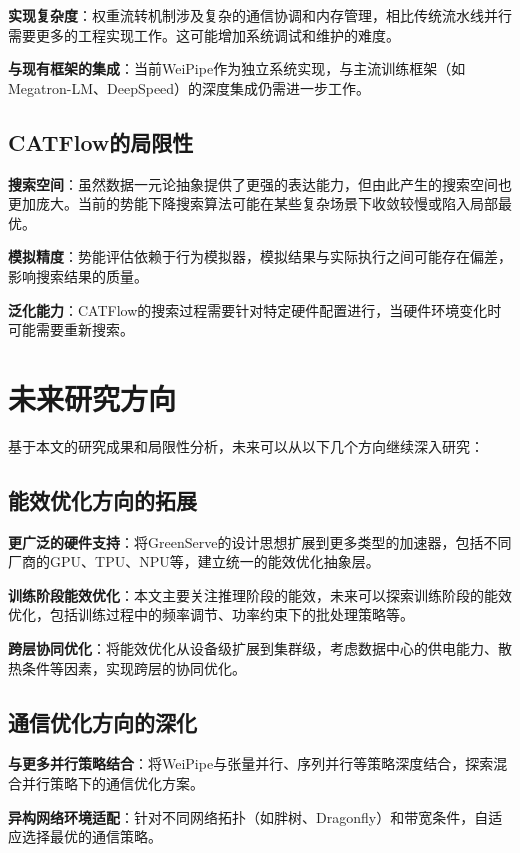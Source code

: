 \textbf{实现复杂度}：权重流转机制涉及复杂的通信协调和内存管理，相比传统流水线并行需要更多的工程实现工作。这可能增加系统调试和维护的难度。

\textbf{与现有框架的集成}：当前WeiPipe作为独立系统实现，与主流训练框架（如Megatron-LM、DeepSpeed）的深度集成仍需进一步工作。

\subsection{CATFlow的局限性}

\textbf{搜索空间}：虽然数据一元论抽象提供了更强的表达能力，但由此产生的搜索空间也更加庞大。当前的势能下降搜索算法可能在某些复杂场景下收敛较慢或陷入局部最优。

\textbf{模拟精度}：势能评估依赖于行为模拟器，模拟结果与实际执行之间可能存在偏差，影响搜索结果的质量。

\textbf{泛化能力}：CATFlow的搜索过程需要针对特定硬件配置进行，当硬件环境变化时可能需要重新搜索。

\section{未来研究方向}

基于本文的研究成果和局限性分析，未来可以从以下几个方向继续深入研究：

\subsection{能效优化方向的拓展}

\textbf{更广泛的硬件支持}：将GreenServe的设计思想扩展到更多类型的加速器，包括不同厂商的GPU、TPU、NPU等，建立统一的能效优化抽象层。

\textbf{训练阶段能效优化}：本文主要关注推理阶段的能效，未来可以探索训练阶段的能效优化，包括训练过程中的频率调节、功率约束下的批处理策略等。

\textbf{跨层协同优化}：将能效优化从设备级扩展到集群级，考虑数据中心的供电能力、散热条件等因素，实现跨层的协同优化。

\subsection{通信优化方向的深化}

\textbf{与更多并行策略结合}：将WeiPipe与张量并行、序列并行等策略深度结合，探索混合并行策略下的通信优化方案。

\textbf{异构网络环境适配}：针对不同网络拓扑（如胖树、Dragonfly）和带宽条件，自适应选择最优的通信策略。

